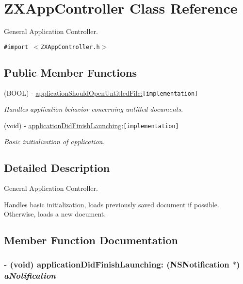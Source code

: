 \hypertarget{interface_z_x_app_controller}{
\section{ZXAppController Class Reference}
\label{interface_z_x_app_controller}
}
General Application Controller.  


{\tt \#import $<$ZXAppController.h$>$}

\subsection*{Public Member Functions}
\begin{CompactItemize}
\item 
(BOOL) - \hyperlink{interface_z_x_app_controller_6ced841705b02c4f5b6866dd381edc8e}{applicationShouldOpenUntitledFile:}{\tt  \mbox{[}implementation\mbox{]}}
\begin{CompactList}\small\item\em Handles application behavior concerning untitled documents. \item\end{CompactList}\item 
(void) - \hyperlink{interface_z_x_app_controller_90d233c6214bc6fc1f88192f6d94e92a}{applicationDidFinishLaunching:}{\tt  \mbox{[}implementation\mbox{]}}
\begin{CompactList}\small\item\em Basic initialization of application. \item\end{CompactList}\end{CompactItemize}


\subsection{Detailed Description}
General Application Controller. 

Handles basic initialization, loads previously saved document if possible. Otherwise, loads a new document. 

\subsection{Member Function Documentation}
\hypertarget{interface_z_x_app_controller_90d233c6214bc6fc1f88192f6d94e92a}{
\subsubsection[{applicationDidFinishLaunching:}]{\setlength{\rightskip}{0pt plus 5cm}- (void) applicationDidFinishLaunching: (NSNotification $\ast$) {\em aNotification}}}
\label{interface_z_x_app_controller_90d233c6214bc6fc1f88192f6d94e92a}


